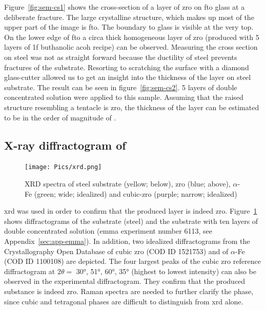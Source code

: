 Figure~\ref{fig:sem-cs1} shows the cross-section of a layer of \gls{zro} on \gls{fto} glass at a deliberate fracture.
The large crystalline structure, which makes up most of the upper part of the image is \gls{fto}. 
The boundary to glass is visible at the very top. 
On the lower edge of \gls{fto} a circa  thick homogeneous layer of \gls{zro} (produced with 5 layers of \gls{1f} buthanolic \gls{acoh} recipe)  can be observed.
Measuring the cross section on steel was not as straight forward because the ductility of steel prevents fractures of the substrate. 
Resorting to scratching the surface with a diamond glass-cutter allowed us to get an insight into the thickness of the layer on steel substrate.
%
The result can be seen in figure~\ref{fig:sem-cs2}. 
5 layers of double concentrated solution were applied to this sample. 
Assuming that the raised structure resembling a tentacle is \gls{zro}, 
the thickness of the layer can be estimated to be in the order of magnitude of .

\subsection{X-ray diffractogram of }
\begin{figure}
	\centering
	\texttt{[image: Pics/xrd.png]}
	\caption{XRD spectra of steel substrate (yellow; below), \gls{zro} (blue; above), $\alpha$-Fe (green; wide; idealized) and cubic-\gls{zro} (purple; narrow; idealized)\cite{gkatz1971xray} }%
	\label{fig:xrd}
\end{figure}

\Gls{xrd} was used in order to confirm that the produced layer is indeed \gls{zro}. 
Figure~\ref{fig:xrd} shows diffractograms of the substrate (steel) and 
the substrate with ten layers of double concentrated solution (\gls{emma} experiment number 6113, see Appendix~\ref{sec:app-emma}).
In addition, two idealized diffractograms from the Crystallography Open Database of cubic \gls{zro} (COD ID 1521753\cite{gkatz1971xray}) and of $\alpha$-Fe (COD ID 1100108) are depicted.
%
The four largest peaks of the cubic \gls{zro} reference diffractogram at $2\theta=$ \ang{30}, \ang{51}, \ang{60}, \ang{35} (highest to lowest intensity) can also be observed in the experimental diffractogram. %
They confirm that the produced substance is indeed \gls{zro}.
Raman spectra are needed to further clarify the phase, 
since cubic and tetragonal phases are difficult to distinguish from \gls{xrd} alone\cite{Purohit2006Combustion}.

